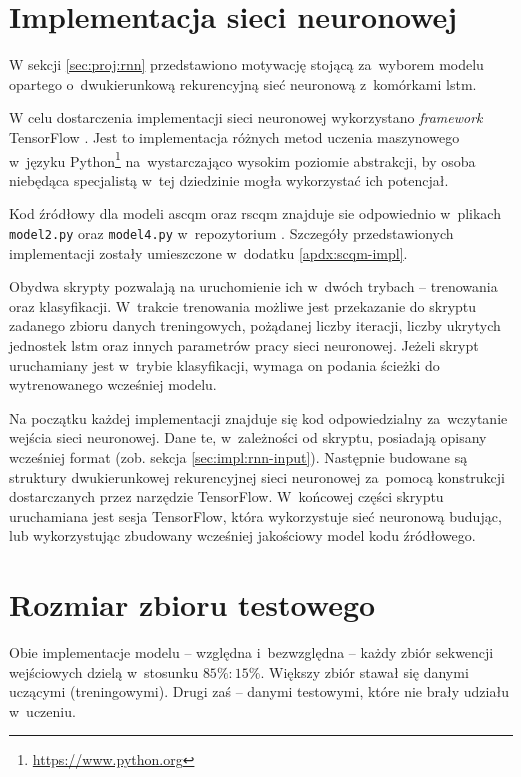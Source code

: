 \documentclass[twoside]{praca}
\begin{document}
\section{Implementacja sieci neuronowej}
\label{sec:impl:rnn}

W sekcji \ref{sec:proj:rnn} przedstawiono motywację stojącą za~wyborem modelu opartego o~dwukierunkową rekurencyjną sieć neuronową z~komórkami \gls{lstm}.

W celu dostarczenia implementacji sieci neuronowej wykorzystano \textit{framework} TensorFlow \cite{tf}. Jest to implementacja różnych metod uczenia maszynowego w~języku Python\footnote{\url{https://www.python.org}} na~wystarczająco wysokim poziomie abstrakcji, by osoba niebędąca specjalistą w~tej dziedzinie mogła wykorzystać ich potencjał.

Kod źródłowy dla modeli \gls{ascqm} oraz \gls{rscqm} znajduje sie odpowiednio w~plikach \texttt{model2.py} oraz \texttt{model4.py} w~repozytorium \cite{fracz:code-quality-tf}. Szczegóły przedstawionych implementacji zostały umieszczone w~dodatku \ref{apdx:scqm-impl}.

Obydwa skrypty pozwalają na uruchomienie ich w~dwóch trybach -- trenowania oraz klasyfikacji. W~trakcie trenowania możliwe jest przekazanie do skryptu zadanego zbioru danych treningowych, pożądanej liczby iteracji, liczby ukrytych jednostek \gls{lstm} oraz innych parametrów pracy sieci neuronowej. Jeżeli skrypt uruchamiany jest w~trybie klasyfikacji, wymaga on podania ścieżki do wytrenowanego wcześniej modelu.

Na początku każdej implementacji znajduje się kod odpowiedzialny za~wczytanie wejścia sieci neuronowej. Dane te, w~zależności od skryptu, posiadają opisany wcześniej format (zob. sekcja \ref{sec:impl:rnn-input}). Następnie budowane są struktury dwukierunkowej rekurencyjnej sieci neuronowej za~pomocą konstrukcji dostarczanych przez narzędzie TensorFlow. W~końcowej części skryptu uruchamiana jest sesja TensorFlow, która wykorzystuje sieć neuronową budując, lub wykorzystując zbudowany wcześniej jakościowy model kodu źródłowego.

\section{Rozmiar zbioru testowego}

Obie implementacje modelu -- względna i~bezwzględna -- każdy zbiór sekwencji wejściowych dzielą w~stosunku $85\%:15\%$. Większy zbiór stawał się danymi uczącymi (treningowymi). Drugi zaś -- danymi testowymi, które nie brały udziału w~uczeniu. 
\end{document}
